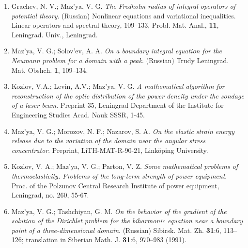 \documentclass{article}
\begin{document}
\begin{enumerate}
{\bf 1990}
\item Grachev, N. V.; Maz'ya, V. G. {\it The Fredholm radius of
integral
operators of potential theory}. (Russian) Nonlinear
equations and variational inequalities. Linear operators and spectral
theory, 109--133, Probl. Mat. Anal., {\bf 11},
Leningrad. Univ., Leningrad.
\item Maz'ya, V. G.; Solov'ev, A. A. {\it On a boundary integral
equation
for the Neumann
problem for a domain with a peak}. (Russian) Trudy Leningrad. Mat.
Obshch.
{\bf 1}, 109--134.
\item Kozlov, V.A.; Levin, A.V.; Maz'ya, V. G. {\it A mathematical
algorithm 
 for reconstruction of the
optic distribution of the power dencity under the
sondage of a laser beam}. Preprint 35, Leningrad Department of the
Institute for Engineering Studies Acad. Nauk SSSR, 1-45.


\item Maz'ya, V. G.; Morozov, N. F.; Nazarov, S. A. {\it On the
elastic
strain energy release due to the variation of the domain
near the angular stress concentrator}. Preprint, LiTH-MAT-R-90-21,
Link\"oping University.
\item Kozlov, V. A.; Maz'ya, V. G.; Parton, V. Z. {\it Some
mathematical
problems of thermoelasticity. Problems of the long-term
strength of power equipment}. Proc. of the Polzunov Central Research
Institute of power equipment, Leningrad, no. 260,
55-67.
\item Maz'ya, V. G.; Tashchiyan, G. M. {\it On the behavior of the
gradient
of the solution of the Dirichlet problem
for the biharmonic equation near a boundary point of a
three-dimensional
domain}. (Russian) Sibirsk. Mat. Zh. {\bf 31}:6,
113--126; translation in Siberian Math. J. {\bf 31}:6, 970--983
(1991).
\hfill\break


\end{enumerate}
\end{document}
